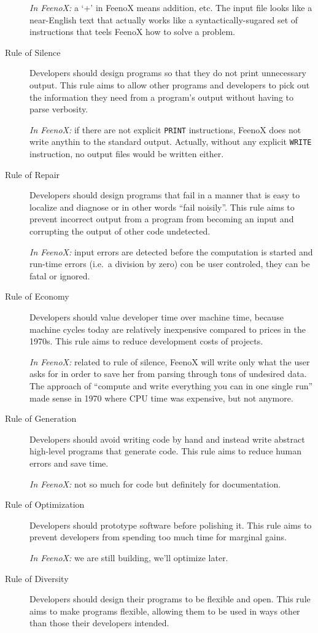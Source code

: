 \documentclass[
  american,
]{article}
\begin{document}
\begin{description}
\emph{In FeenoX:} a `+' in FeenoX means addition, etc. The input file
looks like a near-English text that actually works like a
syntactically-sugared set of instructions that teels FeenoX how to solve
a problem.
\item[Rule of Silence]
Developers should design programs so that they do not print unnecessary
output. This rule aims to allow other programs and developers to pick
out the information they need from a program's output without having to
parse verbosity.

\emph{In FeenoX:} if there are not explicit
\passthrough{\lstinline!PRINT!} instructions, FeenoX does not write
anythin to the standard output. Actually, without any explicit
\passthrough{\lstinline!WRITE!} instruction, no output files would be
written either.
\item[Rule of Repair]
Developers should design programs that fail in a manner that is easy to
localize and diagnose or in other words ``fail noisily''. This rule aims
to prevent incorrect output from a program from becoming an input and
corrupting the output of other code undetected.

\emph{In FeenoX:} input errors are detected before the computation is
started and run-time errors (i.e.~a division by zero) con be user
controled, they can be fatal or ignored.
\item[Rule of Economy]
Developers should value developer time over machine time, because
machine cycles today are relatively inexpensive compared to prices in
the 1970s. This rule aims to reduce development costs of projects.

\emph{In FeenoX:} related to rule of silence, FeenoX will write only
what the user asks for in order to save her from parsing through tons of
undesired data. The approach of ``compute and write everything you can
in one single run'' made sense in 1970 where CPU time was expensive, but
not anymore.
\item[Rule of Generation]
Developers should avoid writing code by hand and instead write abstract
high-level programs that generate code. This rule aims to reduce human
errors and save time.

\emph{In FeenoX:} not so much for code but definitely for documentation.
\item[Rule of Optimization]
Developers should prototype software before polishing it. This rule aims
to prevent developers from spending too much time for marginal gains.

\emph{In FeenoX:} we are still building, we'll optimize later.
\item[Rule of Diversity]
Developers should design their programs to be flexible and open. This
rule aims to make programs flexible, allowing them to be used in ways
other than those their developers intended.


\end{description}
\end{document}
